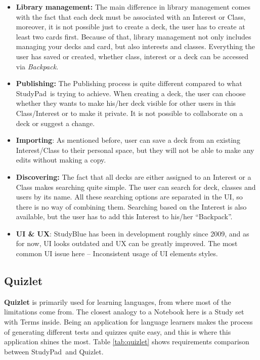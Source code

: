 \documentclass[thesis=B,english]{FITthesis}[2012/10/20]
\newcommand{\appname}{StudyPad}
\begin{document}
\begin{itemize}
	\item \textbf{Library management:} The main difference in library management comes with the fact that each deck must be associated with an Interest or Class, moreover, it is not possible just to create a deck, the user has to create at least two cards first. Because of that, library management not only includes managing your decks and card, but also interests and classes. Everything the user has saved or created, whether class, interest or a deck can be accessed via \textit{Backpack}.
	\item \textbf{Publishing:} The Publishing process is quite different compared  to what \appname\ is trying to achieve. When creating a deck, the user can choose whether they wants to make his/her deck visible for other users in this Class/Interest or to make it private. It is not possible to collaborate on a deck or suggest a change.
	
	\item \textbf{Importing}: As mentioned before, user can save a deck from an existing Interest/Class to their personal space, but they will not be able to make any edits without making a copy.
	\item \textbf{Discovering:} The fact that all decks are either assigned to an Interest or a Class makes searching quite simple. The user can search for deck, classes and users by its name. All these searching options are separated in the UI, so there is no way of combining them. Searching based on the Interest is also available, but the user has to add this Interest to his/her \enquote{Backpack}.
	\item \textbf{UI \&  UX}: StudyBlue has been in development roughly since 2009, and as for now, UI looks outdated and UX can be greatly improved. The most common UI issue here -- Inconsistent usage of UI elements styles.
\end{itemize}

 \subsection{Quizlet}
\textbf{Quizlet} is primarily used for learning languages, from where most of the limitations come from. The closest analogy to a Notebook here is a Study set with Terms inside. Being an application for language learners makes the process of generating different tests and quizzes quite easy, and this is where this application shines the most. Table \ref{tab:quizlet} shows requirements comparison between \appname\ and Quizlet.
\end{document}
